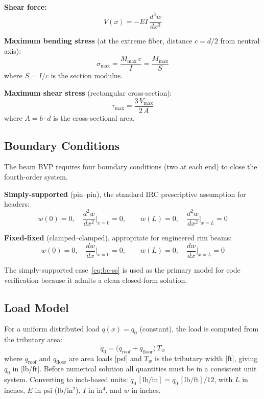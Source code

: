 \textbf{Shear force:}
\begin{equation}
  V(x) = -EI\,\frac{d^3 w}{dx^3}
  \label{eq:shear}
\end{equation}

\textbf{Maximum bending stress} (at the extreme fiber, distance $c = d/2$ from neutral axis):
\begin{equation}
  \sigma_{\max} = \frac{M_{\max}\,c}{I} = \frac{M_{\max}}{S}
  \label{eq:bending-stress}
\end{equation}
where $S = I/c$ is the section modulus.

\textbf{Maximum shear stress} (rectangular cross-section):
\begin{equation}
  \tau_{\max} = \frac{3\,V_{\max}}{2\,A}
  \label{eq:shear-stress}
\end{equation}
where $A = b \cdot d$ is the cross-sectional area.

\subsection{Boundary Conditions}

The beam BVP requires four boundary conditions (two at each end) to close the fourth-order system.

\textbf{Simply-supported} (pin--pin), the standard IRC prescriptive assumption for headers:
\begin{equation}
  w(0) = 0, \quad \frac{d^2 w}{dx^2}\bigg|_{x=0} = 0, \qquad
  w(L) = 0, \quad \frac{d^2 w}{dx^2}\bigg|_{x=L} = 0
  \label{eq:bc-ss}
\end{equation}

\textbf{Fixed-fixed} (clamped--clamped), appropriate for engineered rim beams:
\begin{equation}
  w(0) = 0, \quad \frac{dw}{dx}\bigg|_{x=0} = 0, \qquad
  w(L) = 0, \quad \frac{dw}{dx}\bigg|_{x=L} = 0
  \label{eq:bc-ff}
\end{equation}

The simply-supported case~\eqref{eq:bc-ss} is used as the primary model for code verification because it admits a clean closed-form solution.

\subsection{Load Model}

For a uniform distributed load $q(x) = q_0$ (constant), the load is computed from the tributary area:
\begin{equation}
  q_0 = \bigl(q_{\text{roof}} + q_{\text{floor}}\bigr)\,T_w
  \label{eq:load}
\end{equation}
where $q_{\text{roof}}$ and $q_{\text{floor}}$ are area loads [psf] and $T_w$ is the tributary width [ft], giving $q_0$ in [lb/ft].
Before numerical solution all quantities must be in a consistent unit system.
Converting to inch-based units: $q_0\,[\text{lb/in}] = q_0\,[\text{lb/ft}] / 12$, with $L$ in inches, $E$ in psi (lb/in$^2$), $I$ in in$^4$, and $w$ in inches.

